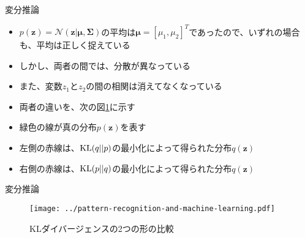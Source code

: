\documentclass[dvipdfmx,notheorems,t]{beamer}
\begin{document}
\begin{frame}{変分推論}
\begin{itemize}
\begin{itemize}
		\item $p(\bm{z}) = \mathcal{N}(\bm{z} | \bm{\mu}, \bm{\Sigma})$の平均は$\bm{\mu} = \left[ \mu_1, \mu_2 \right]^T$であったので、いずれの場合も、\alert{平均は正しく捉えている}
		\item しかし、両者の間では、\alert{分散が異なっている}
		\item また、変数$z_1$と$z_2$の間の\alert{相関は消えてなくなっている}
		\newline
		\item 両者の違いを、次の図\ref{fig:comparison-between-kl-divergence}に示す
		\newline
		\item \color{green}緑色\normalcolor の線が真の分布$p(\bm{z})$を表す
		\item 左側の\color{red}赤線\normalcolor は、$\operatorname{KL}(q || p)$の最小化によって得られた分布$q(\bm{z})$
		\item 右側の\color{red}赤線\normalcolor は、$\operatorname{KL}(p || q)$の最小化によって得られた分布$q(\bm{z})$
	\end{itemize}
\end{itemize}

\end{frame}

\begin{frame}{変分推論}

\begin{figure}[h]
	\centering
	\texttt{[image: ../pattern-recognition-and-machine-learning.pdf]}
	\caption{KLダイバージェンスの2つの形の比較}
	\label{fig:comparison-between-kl-divergence}
\end{figure}

\end{frame}
\end{document}
